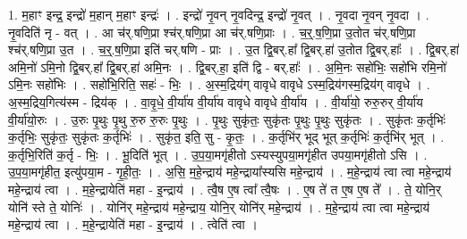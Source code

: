 \documentclass[17pt]{extarticle}
\begin{document}
1. म॒हाꣳ इन्द्र॒ इन्द्रो॑ म॒हान् म॒हाꣳ इन्द्रः॑ । . इन्द्रो॑ नृ॒वन् नृ॒वदिन्द्र॒ इन्द्रो॑ नृ॒वत् । . नृ॒वदा नृ॒वन् नृ॒वदा । . नृ॒वदिति॑ नृ - वत् । . आ च॑र्.षणि॒प्रा श्च॑र्.षणि॒प्रा आ च॑र्.षणि॒प्राः । . च॒र्॒.ष॒णि॒प्रा उ॒तोत च॑र्.षणि॒प्रा श्च॑र्.षणि॒प्रा उ॒त । . च॒र्॒.ष॒णि॒प्रा इति॑ चर्.षणि - प्राः । . उ॒त द्वि॒बर्.हा᳚ द्वि॒बर्.हा॑ उ॒तोत द्वि॒बर्.हाः᳚ । . द्वि॒बर्.हा॑ अमि॒नो॑ ऽमि॒नो द्वि॒बर्.हा᳚ द्वि॒बर्.हा॑ अमि॒नः । . द्वि॒बर्.हा॒ इति॑ द्वि - बर्.हाः᳚ । . अ॒मि॒नः सहो॑भिः॒ सहो॑भि रमि॒नो॑ ऽमि॒नः सहो॑भिः । . सहो॑भि॒रिति॒ सहः॑ - भिः॒ । . अ॒स्म॒द्रिय॑ग् वावृधे वावृधे ऽस्म॒द्रिय॑गस्म॒द्रिय॑ग् वावृधे । . अ॒स्म॒द्रिय॒गित्य॑स्म - द्रिय॑क् । . वा॒वृ॒धे॒ वी॒र्या॑य वी॒र्या॑य वावृधे वावृधे वी॒र्या॑य । . वी॒र्या॑यो॒ रुरु॒रुर् वी॒र्या॑य वी॒र्या॑यो॒रुः । . उ॒रुः पृ॒थुः पृ॒थु रु॒रु रु॒रुः पृ॒थुः । . पृ॒थुः सुकृ॑तः॒ सुकृ॑तः पृ॒थुः पृ॒थुः सुकृ॑तः । . सुकृ॑तः क॒र्तृभिः॑ क॒र्तृभिः॒ सुकृ॑तः॒ सुकृ॑तः क॒र्तृभिः॑ । . सुकृ॑त॒ इति॒ सु - कृ॒तः॒ । . क॒र्तृभि॑र् भूद् भूत् क॒र्तृभिः॑ क॒र्तृभि॑र् भूत् । . क॒र्तृभि॒रिति॑ क॒र्तृ - भिः॒ । . भू॒दिति॑ भूत् । . उ॒प॒या॒मगृ॑हीतो ऽस्यस्युपया॒मगृ॑हीत उपया॒मगृ॑हीतो ऽसि । . उ॒प॒या॒मगृ॑हीत॒ इत्यु॑पया॒म - गृ॒ही॒तः॒ । . अ॒सि॒ म॒हे॒न्द्राय॑ महे॒न्द्राया᳚स्यसि महे॒न्द्राय॑ । . म॒हे॒न्द्राय॑ त्वा त्वा महे॒न्द्राय॑ महे॒न्द्राय॑ त्वा । . म॒हे॒न्द्रायेति॑ महा - इ॒न्द्राय॑ । . त्वै॒ष ए॒ष त्वा᳚ त्वै॒षः । . ए॒ष ते॑ त ए॒ष ए॒ष ते᳚ । . ते॒ योनि॒र् योनि॑ स्ते ते॒ योनिः॑ । . योनि॑र् महे॒न्द्राय॑ महे॒न्द्राय॒ योनि॒र् योनि॑र् महे॒न्द्राय॑ । . म॒हे॒न्द्राय॑ त्वा त्वा महे॒न्द्राय॑ महे॒न्द्राय॑ त्वा । . म॒हे॒न्द्रायेति॑ महा - इ॒न्द्राय॑ । . त्वेति॑ त्वा । \newline
\end{document}
